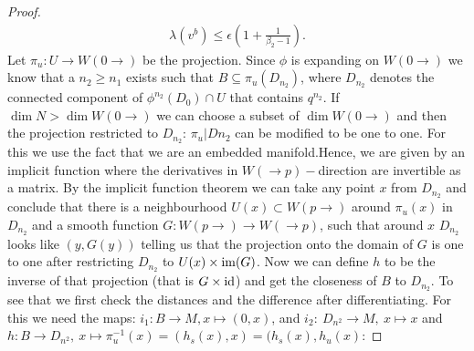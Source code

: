 \begin{proof}
\begin{align*}
		\lambda(v^b)\leq \epsilon(1+\frac{1}{\beta_2-1}).
	\end{align*}
	Let $\pi_u:U \to W(0\to)$ be the projection. Since $\phi$ is expanding on $W(0 \to)$ we know that a $n_2\geq n_1$ exists such that $B\subseteq \pi_u(D_{n_2})$, where $D_{n_2}$ denotes the connected component of $\phi^{n_2}(D_0)\cap U$ that contains $q^{n_2}$. If $\dim N > \dim W(0 \to)$ we can choose a subset of $\dim W(0\to)$ and then the projection restricted to $D_{n_2}$:  $\pi_u|{D{n_2}}$ can be modified to be one to one. For this we use the fact that we are an embedded manifold.Hence, we are given by an implicit function where the derivatives in $W(\to p)-$direction are invertible as a matrix. By the implicit function theorem we can take any point $x$ from $D_{n_2}$ and conclude that there is a neighbourhood $U(x)\subset W(p\to)$ around $\pi_u(x)$ in $D_{n_2}$ and a smooth function $G: W(p\to)\to W(\to p)$, such that around $x$ $D_{n_2}$ looks like $(y,G(y))$ telling us that the projection onto the domain of $G$ is one to one after restricting $D_{n_2}$ to $U(x)\times \mathrm{im}(G)$. Now we can define $h$ to be the inverse of that projection (that is $G\times \operatorname{\mathrm{id}}$) and get the closeness of $B$ to $D_{n_2}$. To see that we first check the distances and the difference after differentiating. For this we need the maps: $i_1:B\to M, x \mapsto (0,x)$, and $i_2: ~D_{n^2} \to M,~ x\mapsto x$ and $h: B \to D_{n^2},~ x \mapsto \pi_u^{-1}(x)=(h_s(x),x)=(h_s(x),h_u(x)$:
	

\end{proof}
